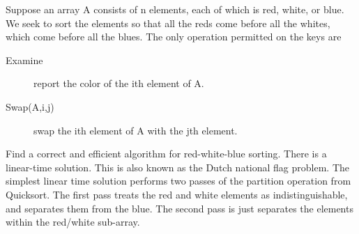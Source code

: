 \begin{problem}
Suppose an array A consists of n elements, each of which is red, white, or blue. We seek to sort the elements so that all the reds come before all the whites, which come before all the blues. The only operation permitted on the keys are
\begin{description}
\item [Examine] report the color of the ith element of A.
\item [Swap(A,i,j)]  swap the ith element of A with the jth element.
\end{description}

Find a correct and efficient algorithm for red-white-blue sorting. There is a linear-time solution. This is also known as the Dutch national flag problem. The simplest linear time solution performs two passes of the partition operation from Quicksort. The first pass treats the red and white elements as indistinguishable, and separates them from the blue. The second pass is just separates the elements within the red/white sub-array.



\begin{solution}


\end{solution}
\end{problem}